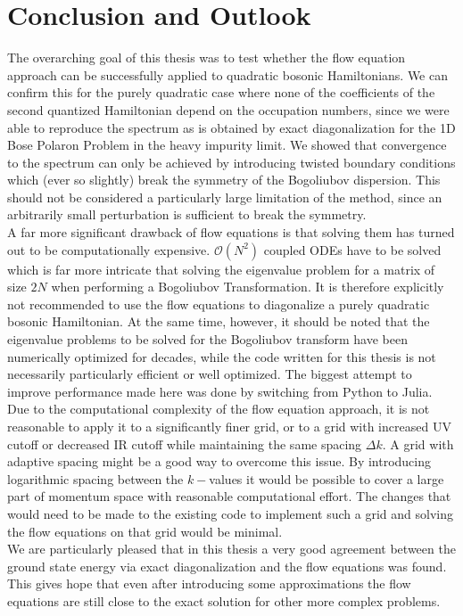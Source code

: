 \chapter{Conclusion and Outlook}\label{Conclusion and Outlook}
The overarching goal of this thesis was to test whether the flow equation approach can be successfully applied to quadratic bosonic Hamiltonians. We can confirm this for the purely quadratic case where none of the coefficients of the second quantized Hamiltonian depend on the occupation numbers, since we were able to reproduce the spectrum as is obtained by exact diagonalization for the 1D Bose Polaron Problem in the heavy impurity limit. We showed that convergence to the spectrum can only be achieved by introducing twisted boundary conditions which (ever so slightly) break the symmetry of the Bogoliubov dispersion. This should not be considered a particularly large limitation of the method, since an arbitrarily small perturbation is sufficient to break the symmetry. \\
A far more significant drawback of flow equations is that solving them has turned out to be computationally expensive. $\mathcal O(N^2)$ coupled ODEs have to be solved which is far more intricate that solving the eigenvalue problem for a matrix of size $2N$ when performing a Bogoliubov Transformation. It is therefore explicitly not recommended to use the flow equations to diagonalize a purely quadratic bosonic Hamiltonian. At the same time, however, it should be noted that the eigenvalue problems to be solved for the Bogoliubov transform have been numerically optimized for decades, while the code written for this thesis is not necessarily particularly efficient or well optimized. The biggest attempt to improve performance made here was done by switching from Python to Julia.\\
Due to the computational complexity of the flow equation approach, it is not reasonable to apply it to a significantly finer grid, or to a grid with increased UV cutoff or decreased IR cutoff while maintaining the same spacing $\Delta k$. A grid with adaptive spacing might be a good way to overcome this issue. By introducing logarithmic spacing between the $k-$values it would be possible to cover a large part of momentum space with reasonable computational effort. The changes that would need to be made to the existing code to implement such a grid and solving the flow equations on that grid would be minimal.   \\ 
We are particularly pleased that in this thesis a very good agreement between the ground state energy via exact diagonalization and the flow equations was found. This gives hope that even after introducing some approximations the flow equations are still close to the exact solution for other more complex problems.\\
